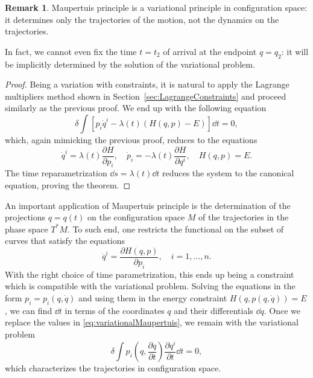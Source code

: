 \documentclass[english,fontsize=11pt,paper=b5]{scrbook}
\theoremstyle{definition}
\newtheorem{remark}{Remark}[chapter]
\begin{document}
    \begin{remark}
      Maupertuis principle is a variational principle in configuration space: it determines only the trajectories of the motion, not the dynamics on the trajectories.

      In fact, we cannot even fix the time $t=t_2$ of arrival at the endpoint $q=q_2$: it will be implicitly determined by the solution of the variational problem.
    \end{remark}

    \begin{proof}
      Being a variation with constraints, it is natural to apply the Lagrange multipliers method shown in Section~\ref{sec:LagrangeConstraints} and proceed similarly as the previous proof. We end up with the following equation
      \begin{equation}
        \delta \int \left[p_i \dot q^i - \lambda(t)\left(H(q,p) - E\right)\right]\dd t = 0,
      \end{equation}
      which, again mimicking the previous proof, reduces to the equations
      \begin{equation}
        \dot q^i = \lambda(t) \frac{\partial H}{\partial p_i},
        \quad
        \dot p_i = -\lambda(t) \frac{\partial H}{\partial q^i},
        \quad H(q,p) = E.
      \end{equation}
      The time reparametrization $\dd s = \lambda(t)\dd t$ reduces the system to the canonical equation, proving the theorem.
    \end{proof}

    An important application of Maupertuis principle is the determination of the projections $q=q(t)$ on the configuration space $M$ of the trajectories in the phase space $T^*M$.
    To such end, one restricts the functional on the subset of curves that satisfy the equations
    \begin{equation}
      \dot q^i = \frac{\partial H(q,p)}{\partial p_i}, \quad i=1,\ldots,n.
    \end{equation}
    With the right choice of time parametrization, this ends up being a constraint which is compatible with the variational problem.
    Solving the equations in the form $p_i = p_i(q,\dot q)$ and using them in the energy constraint $H(q, p(q,\dot q))=E$, we can find $\dd t$ in terms of the coordinates $q$ and their differentials $\dd q$. Once we replace the values in \eqref{eq:variationalMaupertuis}, we remain with the variational problem
    \begin{equation}
      \delta \int p_i\left(q, \frac{\partial q}{\partial t}\right) \frac{\partial q^i}{\partial t} \dd t = 0,
    \end{equation}
    which characterizes the trajectories in configuration space.
\end{document}

